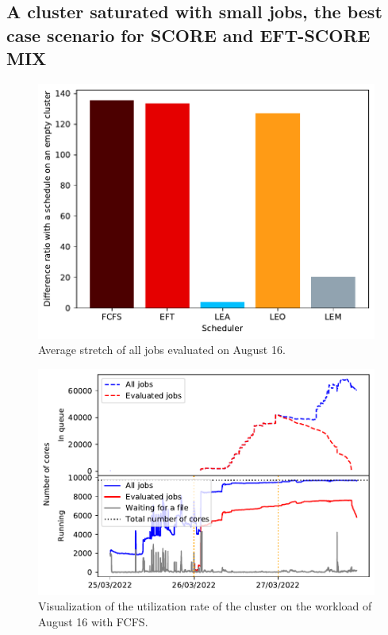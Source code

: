 \documentclass[conference,10pt]{IEEEtran}
\begin{document}
\subsection{A cluster saturated with small jobs, the best case scenario for SCORE and EFT-SCORE MIX}

\begin{figure}[tb]\centering\includegraphics[scale=0.47]{../MBSS/plot/Results_FCFS_Score_Backfill_2022-08-16->2022-08-16_V10000_Mean_Stretch_450_128_32_256_4_1024.pdf}\caption{Average stretch of all jobs evaluated on August 16.}\end{figure}
\begin{figure}[H]\centering\includegraphics[scale=0.47]{../MBSS/plot/Cluster_usage/2022-08-16->2022-08-16_V10000_Fcfs_Used_nodes_Reduced_450_128_32_256_4_1024_core_by_core.pdf}\caption{Visualization of the utilization rate of the cluster on the workload of August 16 with FCFS.}\end{figure}
\end{document}
